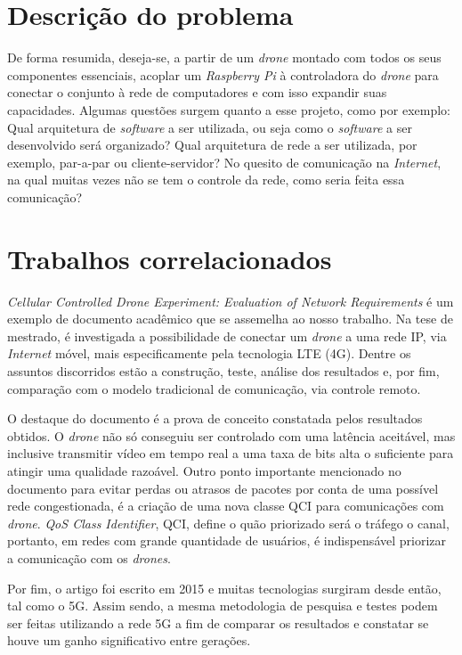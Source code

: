 \documentclass[12pt,a4paper,oneside]{book}
\begin{document}
\section{Descrição do problema}
De forma resumida, deseja-se, a partir de um \textit{drone} montado com todos os seus componentes essenciais, acoplar um \textit{Raspberry Pi} à controladora do \textit{drone} para conectar o conjunto à rede de computadores e com isso expandir suas capacidades. Algumas questões surgem quanto a esse projeto, como por exemplo: Qual arquitetura de \textit{software} a ser utilizada, ou seja como o \textit{software} a ser desenvolvido será organizado? Qual arquitetura de rede a ser utilizada, por exemplo, par-a-par ou cliente-servidor? No quesito de comunicação na \textit{Internet}, na qual muitas vezes não se tem o controle da rede, como seria feita essa comunicação?

\section{Trabalhos correlacionados}

\textit{Cellular Controlled Drone Experiment: Evaluation of Network Requirements}\cite{artigo_relacionado_1} é um exemplo de documento acadêmico que se assemelha ao nosso trabalho. Na tese de mestrado, é investigada a possibilidade de conectar um \textit{drone} a uma rede IP, via \textit{Internet} móvel, mais especificamente pela tecnologia LTE (4G). Dentre os assuntos discorridos estão a construção, teste, análise dos resultados e, por fim, comparação com o modelo tradicional de comunicação, via controle remoto. 

O destaque do documento é a prova de conceito constatada pelos resultados obtidos. O \textit{drone} não só conseguiu ser controlado com uma latência aceitável, mas inclusive transmitir vídeo em tempo real a uma taxa de bits alta o suficiente para atingir uma qualidade razoável. Outro ponto importante mencionado no documento para evitar perdas ou atrasos de pacotes por conta de uma possível rede congestionada, é a criação de uma nova classe QCI para comunicações com \textit{drone}. \textit{QoS Class Identifier}, QCI, define o quão priorizado será o tráfego o canal, portanto, em redes com grande quantidade de usuários, é indispensável priorizar a comunicação com os \textit{drones}. 

Por fim, o artigo foi escrito em 2015 e muitas tecnologias surgiram desde então, tal como o 5G. Assim sendo, a mesma metodologia de pesquisa e testes podem ser feitas utilizando a rede 5G a fim de comparar os resultados e constatar se houve um ganho significativo entre gerações.
\end{document}
